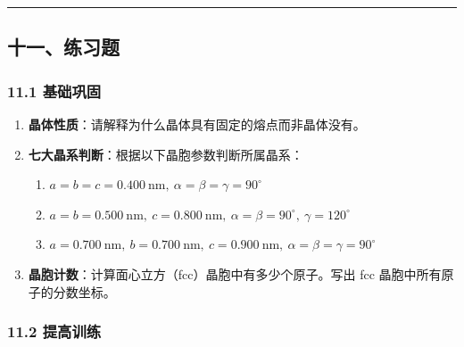 \documentclass[a4paper,11pt]{ctexart}
\providecommand{\tightlist}{\setlength{\itemsep}{0pt}\setlength{\parskip}{0pt}}
\begin{document}
\begin{center}\rule{0.5\linewidth}{0.5pt}\end{center}

\subsection{十一、练习题}\label{ux5341ux4e00ux7ec3ux4e60ux9898}

\subsubsection{11.1 基础巩固}\label{ux57faux7840ux5de9ux56fa}

\begin{enumerate}
\def\labelenumi{\arabic{enumi}.}
\item
  \textbf{晶体性质}：请解释为什么晶体具有固定的熔点而非晶体没有。
\item
  \textbf{七大晶系判断}：根据以下晶胞参数判断所属晶系：

  \begin{enumerate}
  \def\labelenumii{(\arabic{enumii})}
  \tightlist
  \item
    \(a = b = c = 0.400\ \mathrm{nm},\ \alpha = \beta = \gamma = 90^\circ\)
  \item
    \(a = b = 0.500\ \mathrm{nm},\ c = 0.800\ \mathrm{nm},\ \alpha = \beta = 90^\circ,\ \gamma = 120^\circ\)
  \item
    \(a = 0.700\ \mathrm{nm},\ b = 0.700\ \mathrm{nm},\ c = 0.900\ \mathrm{nm},\ \alpha = \beta = \gamma = 90^\circ\)
  \end{enumerate}
\item
  \textbf{晶胞计数}：计算面心立方（fcc）晶胞中有多少个原子。写出 fcc 晶胞中所有原子的分数坐标。
\end{enumerate}

\subsubsection{11.2 提高训练}\label{ux63d0ux9ad8ux8badux7ec3}
\end{document}
